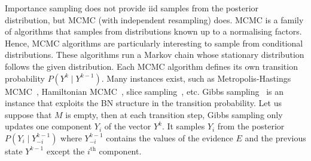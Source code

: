 Importance sampling does not provide iid samples from the posterior distribution, but MCMC (with independent resampling) does. MCMC is a family of algorithms that samples from distributions known up to a normalising factors. Hence, MCMC algorithms are particularly interesting to sample from conditional distributions. These algorithms run a Markov chain whose stationary distribution follows the given distribution. Each MCMC algorithm defines its own transition probability $P(Y^k\mid Y^{k-1})$. Many instances exist, such as Metropolis-Hastings MCMC~\citep{hastings1970monte}, Hamiltonian MCMC~\citep{neal2011mcmc}, slice sampling~\citep{neal2003slice}, etc. Gibbs sampling~\citep{sorensen1995bayesian} is an instance that exploits the BN structure in the transition probability. Let us suppose that $M$ is empty, then at each transition step, Gibbs sampling only updates one component $Y_i$ of the vector $Y^k$. It samples $Y_i$ from the posterior $P(Y_i\mid Y_{-i}^{k-1})$ where $Y_{-i}^{k-1}$ contains the values of the evidence $E$ and the previous state $Y^{k-1}$ except the $i^{\text{th}}$ component.


